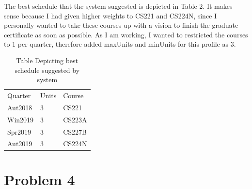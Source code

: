 \documentclass[12pt]{article}
\begin{document}
\begin{enumerate}[label=(\alph*)]
The best schedule that the system suggested is depicted in Table 2. It makes sense because I had given higher weights to CS221 and CS224N, since I personally wanted to take these courses up with a vision to finish the graduate certificate as soon as possible. As I am working, I wanted to restricted the courses to 1 per quarter, therefore added maxUnits and minUnits for this profile as 3.
\begin{table}
\centering
\caption{Table Depicting best schedule suggested by system}
\begin{tabular}{lll}
Quarter & Units & Course  \\
Aut2018 & 3     & CS221   \\
Win2019 & 3     & CS223A  \\
Spr2019 & 3     & CS227B  \\
Aut2019 & 3     & CS224N 
\end{tabular}
\end{table}
\end{enumerate}

\section*{Problem 4}
\end{document}
